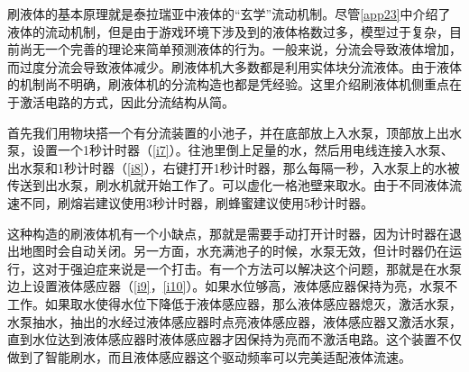 \begin{example}[刷液体]

刷液体的基本原理就是泰拉瑞亚中液体的“玄学”流动机制。尽管\autoref{app23}中介绍了液体的流动机制，但是由于游戏环境下涉及到的液体格数过多，模型过于复杂，目前尚无一个完善的理论来简单预测液体的行为。一般来说，分流会导致液体增加，而过度分流会导致液体减少。刷液体机大多数都是利用实体块分流液体。由于液体的机制尚不明确，刷液体机的分流构造也都是凭经验。这里介绍刷液体机侧重点在于激活电路的方式，因此分流结构从简。

首先我们用物块搭一个有分流装置的小池子，并在底部放上入水泵，顶部放上出水泵，设置一个1秒计时器（\autoref{i7}）。往池里倒上足量的水，然后用电线连接入水泵、出水泵和1秒计时器（\autoref{i8}），右键打开1秒计时器，那么每隔一秒，入水泵上的水被传送到出水泵，刷水机就开始工作了。可以虚化一格池壁来取水。由于不同液体流速不同，刷熔岩建议使用3秒计时器，刷蜂蜜建议使用5秒计时器。

这种构造的刷液体机有一个小缺点，那就是需要手动打开计时器，因为计时器在退出地图时会自动关闭。另一方面，水充满池子的时候，水泵无效，但计时器仍在运行，这对于强迫症来说是一个打击。有一个方法可以解决这个问题，那就是在水泵边上设置液体感应器（\autoref{i9}，\autoref{i10}）。如果水位够高，液体感应器保持为亮，水泵不工作。如果取水使得水位下降低于液体感应器，那么液体感应器熄灭，激活水泵，水泵抽水，抽出的水经过液体感应器时点亮液体感应器，液体感应器又激活水泵，直到水位达到液体感应器时液体感应器才因保持为亮而不激活电路。这个装置不仅做到了智能刷水，而且液体感应器这个驱动频率可以完美适配液体流速。


\end{example}
